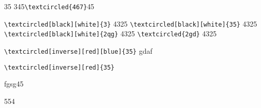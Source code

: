 \documentclass{ctexart}
\begin{document}
35 345\verb|\textcircled{467}|45

 \verb|\textcircled[black][white]{3}| 4325
   \verb|\textcircled[black][white]{35}| 4325
  \verb|\textcircled[black][white]{2qg}| 4325
    \verb|\textcircled{2gd}| 4325
 
  \verb|\textcircled[inverse][red][blue]{35}| gdaf
  
   \verb|\textcircled[inverse][red]{35}|

fgsg45
   
\newcommand{\wcnt}{}

\wcnt5\wcnt5\wcnt4\wcnt\wcnt
\end{document}
